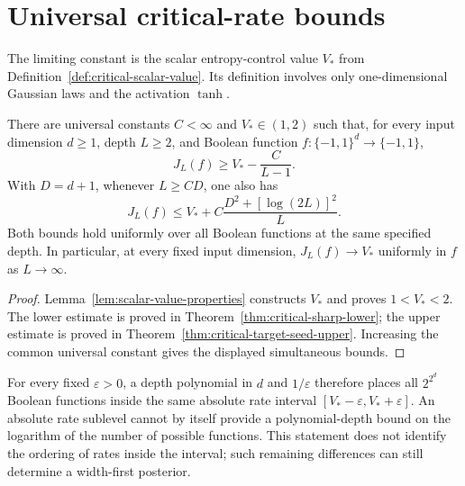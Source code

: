 \section{Universal critical-rate bounds}
\label{sec:critical-main-theorem}

The limiting constant is the scalar entropy-control value $V_*$ from
Definition~\ref{def:critical-scalar-value}. Its definition involves only
one-dimensional Gaussian laws and the activation $\tanh$.

\begin{theorem}
\label{thm:critical-rate-flattening}
There are universal constants $C<\infty$ and $V_*\in(1,2)$ such that,
for every input dimension $d\ge1$, depth $L\ge2$, and Boolean function
$f:\{-1,1\}^d\to\{-1,1\}$,
\[
 J_L(f)\ge V_*-\frac C{L-1}.
\]
With $D=d+1$, whenever $L\ge CD$, one also has
\[
 J_L(f)\le V_*+
 C\frac{D^2+[\log(2L)]^2}{L}.
\]
Both bounds hold uniformly over all Boolean functions at the same
specified depth. In particular, at every fixed input dimension,
$J_L(f)\to V_*$ uniformly in $f$ as $L\to\infty$.
\end{theorem}

\begin{proof}
Lemma~\ref{lem:scalar-value-properties} constructs $V_*$ and proves
$1<V_*<2$. The lower estimate is proved in
Theorem~\ref{thm:critical-sharp-lower}; the upper estimate is proved in
Theorem~\ref{thm:critical-target-seed-upper}. Increasing the common universal
constant gives the displayed simultaneous bounds.
\end{proof}

For every fixed $\varepsilon>0$, a depth polynomial in $d$ and
$1/\varepsilon$ therefore places all $2^{2^d}$ Boolean functions inside
the same absolute rate interval $[V_*-\varepsilon,V_*+\varepsilon]$.
An absolute rate sublevel cannot by itself provide a polynomial-depth
bound on the logarithm of the number of possible functions. This
statement does not identify the ordering of rates inside the interval;
such remaining differences can still determine a width-first posterior.

